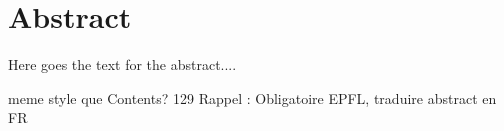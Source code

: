 \section*{Abstract}

Here goes the text for the abstract....

meme style que Contents?
 129 Rappel : Obligatoire EPFL, traduire abstract en FR

